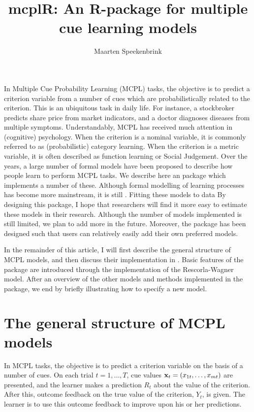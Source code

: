 \documentclass[doc]{apa}
\title{mcplR: An R-package for multiple cue learning models}
\author{Maarten Speekenbrink}
\affiliation{Department of Cognitive, Perceptual and Brain Sciences \\ University College London}
\renewcommand{\vec}[1]{\text{\bf{#1}}}
\newcommand{\code}[1]{{\ttfamily{#1}}}
\begin{document}
\maketitle

In Multiple Cue Probability Learning (MCPL) tasks, the objective is to predict a criterion variable from a number of cues which are probabilistically related to the criterion. This is an ubiquitous task in daily life. For instance, a stockbroker predicts share price from market indicators, and a doctor diagnoses diseases from multiple symptoms. Understandably, MCPL has received much attention in (cognitive) psychology. When the criterion is a nominal variable, it is commonly referred to as (probabilistic) category learning. When the criterion is a metric variable, it is often described as function learning or Social Judgement. Over the years, a large number of formal models have been proposed to describe how people learn to perform MCPL tasks. We describe here an \code{R} package which implements a number of these. Although formal modelling of learning processes has become more mainstream, it is still . Fitting these models to data By designing this package, I hope that researchers will find it more easy to estimate these models in their research. Although the number of models implemented is still limited, we plan to add more in the future. Moreover, the package has been designed such that users can relatively easily add their own preferred models. 

In the remainder of this article, I will first describe the general structure of MCPL models, and then discuss their implementation in \code{mcplR}. Basic features of the package are introduced through the implementation of the Rescorla-Wagner model. After an overview of the other models and methods implemented in the package, we end by briefly illustrating how to specify a new model. 

\section{The general structure of MCPL models}

In MCPL tasks, the objective is to predict a criterion variable on the basis of a number of cues. On each trial $t = 1,\ldots,T$, cue values $\vec{x}_t = (x_{1t},\ldots,x_{mt})$ are presented, and the learner makes a prediction $R_t$ about the value of the criterion. After this, outcome feedback on the true value of the criterion, $Y_t$, is given. The learner is to use this outcome feedback to improve upon his or her predictions.
\end{document}
